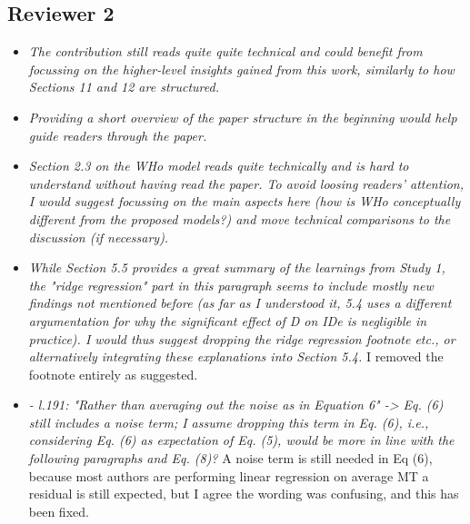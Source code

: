 \documentclass{article}
\begin{document}
\subsection*{Reviewer 2}
\begin{itemize}
  \item \textit{The contribution still reads quite quite technical and could benefit from focussing on the higher-level insights gained from this work, similarly to how Sections 11 and 12 are structured.}
  \item \textit{Providing a short overview of the paper structure in the beginning would help guide readers through the paper.}
  \item \textit{Section 2.3 on the WHo model reads quite technically and is hard to understand without having read the paper. To avoid loosing readers' attention, I would suggest focussing on the main aspects here (how is WHo conceptually different from the proposed models?) and move technical comparisons to the discussion (if necessary).}
  \item \textit{While Section 5.5 provides a great summary of the learnings from Study 1, the "ridge regression" part in this paragraph seems to include mostly new findings not mentioned before (as far as I understood it, 5.4 uses a different argumentation for why the significant effect of D on IDe is negligible in practice). I would thus suggest dropping the ridge regression footnote etc., or alternatively integrating these explanations into Section 5.4.} I removed the footnote entirely as suggested.
  \item \textit{- l.191: "Rather than averaging out the noise as in Equation 6" -> Eq. (6) still includes a noise term; I assume dropping this term in Eq. (6), i.e., considering Eq. (6) as expectation of Eq. (5), would be more in line with the following paragraphs and Eq. (8)?} A noise term is still needed in Eq (6), because most authors are performing linear regression on average MT \ie a residual is still expected, but I agree the wording was confusing, and this has been fixed.
\end{itemize}
\end{document}
